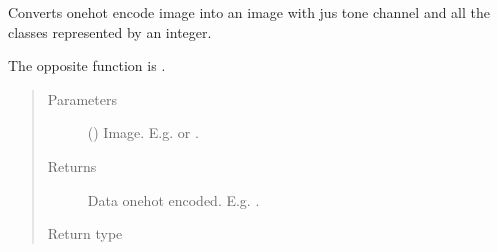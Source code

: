 \documentclass[letterpaper,10pt,english]{sphinxmanual}
\begin{document}
\begin{fulllineitems}
\label{\detokenize{utils/util:utils.util.onehot_encoding_to_img}}
Converts one\sphinxhyphen{}hot encode image into an image with jus tone channel and all the classes represented by an integer.

The opposite function is {\hyperref[\detokenize{utils/util:utils.util.img_to_onehot_encoding}]{}}.
\begin{quote}\begin{description}
\item[{Parameters}] \leavevmode
{} () \textendash{} Image. E.g.  or .

\item[{Returns}] \leavevmode
{} \textendash{} Data one\sphinxhyphen{}hot encoded. E.g. .

\item[{Return type}] \leavevmode
{}

\end{description}\end{quote}

\end{fulllineitems}

\end{document}
